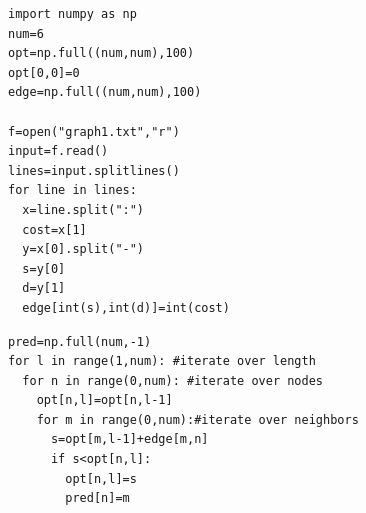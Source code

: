 \documentclass{beamer}
\begin{document}
\begin{frame}[fragile]
\begin{lstlisting}
import numpy as np
num=6
opt=np.full((num,num),100)
opt[0,0]=0
edge=np.full((num,num),100)

f=open("graph1.txt","r")
input=f.read()
lines=input.splitlines()
for line in lines:
  x=line.split(":")
  cost=x[1]
  y=x[0].split("-")
  s=y[0]
  d=y[1]
  edge[int(s),int(d)]=int(cost)
\end{lstlisting}
\end{frame}
\begin{frame}[fragile]
\begin{lstlisting}
pred=np.full(num,-1)
for l in range(1,num): #iterate over length
  for n in range(0,num): #iterate over nodes
    opt[n,l]=opt[n,l-1]
    for m in range(0,num):#iterate over neighbors
      s=opt[m,l-1]+edge[m,n]
      if s<opt[n,l]:
        opt[n,l]=s
        pred[n]=m
\end{lstlisting}
\end{frame}
\end{document}
